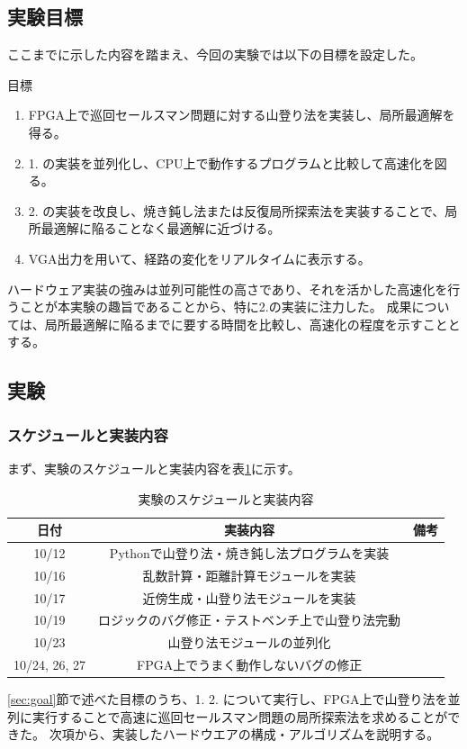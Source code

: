 \subsection*{実験目標}\label{sec:goal}
ここまでに示した内容を踏まえ、今回の実験では以下の目標を設定した。
\begin{itembox}[h]{目標}
    \begin{enumerate}
        \item FPGA上で巡回セールスマン問題に対する山登り法を実装し、局所最適解を得る。
        \item 1. の実装を並列化し、CPU上で動作するプログラムと比較して高速化を図る。
        \item 2. の実装を改良し、焼き鈍し法または反復局所探索法を実装することで、局所最適解に陥ることなく最適解に近づける。
        \item VGA出力を用いて、経路の変化をリアルタイムに表示する。
    \end{enumerate}
\end{itembox}
ハードウェア実装の強みは並列可能性の高さであり、それを活かした高速化を行うことが本実験の趣旨であることから、特に2.の実装に注力した。
成果については、局所最適解に陥るまでに要する時間を比較し、高速化の程度を示すこととする。

\subsection*{実験}
\subsubsection*{スケジュールと実装内容}
まず、実験のスケジュールと実装内容を表\ref{tab:schedule}に示す。
\begin{table}
    \label{tab:schedule}
    \begin{center}
        \caption{実験のスケジュールと実装内容}
        \begin{tabular}{|c|c|c|} \hline
            日付 & 実装内容 & 備考 \\ \hline
            10/12 & Pythonで山登り法・焼き鈍し法プログラムを実装 &  \\ \hline
            10/16 & 乱数計算・距離計算モジュールを実装 &  \\ \hline
            10/17 & 近傍生成・山登り法モジュールを実装 &  \\ \hline
            10/19 & ロジックのバグ修正・テストベンチ上で山登り法完動 &  \\ \hline
            10/23 & 山登り法モジュールの並列化 &  \\ \hline
            10/24, 26, 27 & FPGA上でうまく動作しないバグの修正 &  \\ \hline
        \end{tabular}
    \end{center}
\end{table}
\ref{sec:goal}節で述べた目標のうち、1. 2. について実行し、FPGA上で山登り法を並列に実行することで高速に巡回セールスマン問題の局所探索法を求めることができた。
次項から、実装したハードウエアの構成・アルゴリズムを説明する。


